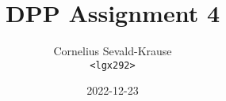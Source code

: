 \documentclass{article}
\begin{document}
\title{DPP Assignment 4}
\author{Cornelius Sevald-Krause \\ \texttt{<lgx292>}}
\date{2022-12-23}
\maketitle
\end{document}
